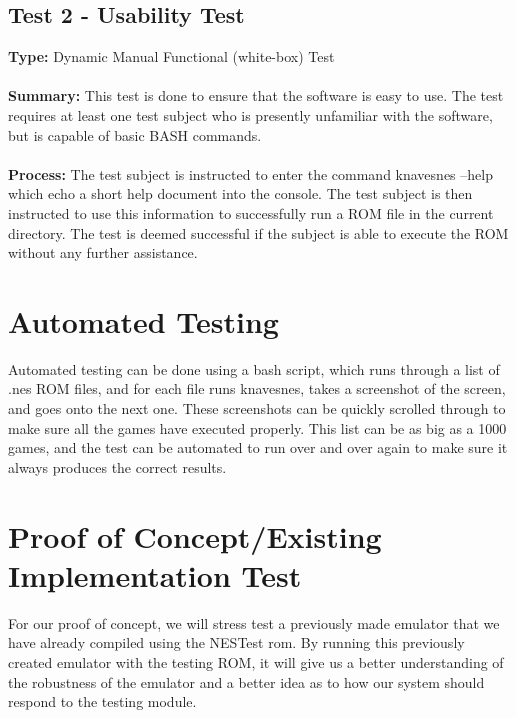 \documentclass[12pt]{article}
\begin{document}
	\subsection{Test 2 - Usability Test}
		\textbf{Type: } Dynamic Manual Functional (white-box) Test\\\\
		\textbf{Summary: } This test is done to ensure that the software is easy to use. The test requires at least one test subject who is presently unfamiliar with the software, but is capable of basic BASH commands.\\\\
		\textbf{Process: } The test subject is instructed to enter the command knavesnes --help which echo a short help document into the console. The test subject is then instructed to use this information to successfully run a ROM file in the current directory. The test is deemed successful if the subject is able to execute the ROM without any further assistance. 
\section{Automated Testing}
	Automated testing can be done using a bash script, which runs through a list of .nes ROM files, and for each file runs knavesnes, takes a screenshot of the screen, and goes onto the next one. These screenshots can be quickly scrolled through to make sure all the games have executed properly. This list can be as big as a 1000 games, and the test can be automated to run over and over again to make sure it always produces the correct results.
\section{Proof of Concept/Existing Implementation Test}
	For our proof of concept, we will stress test a previously made emulator that we have already compiled using the NESTest rom. By running this previously created emulator with the testing ROM, it will give us a better understanding of the robustness of the emulator and a better idea as to how our system should respond to the testing module.
\end{document}
